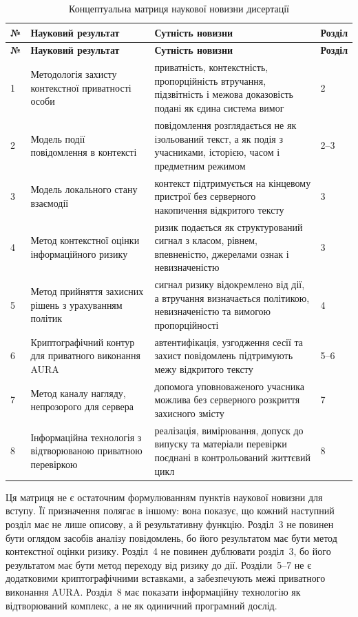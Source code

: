 \begin{longtable}{p{1.1cm} p{5.3cm} p{4.6cm} p{1.8cm}}
\caption{Концептуальна матриця наукової новизни дисертації}
\label{tab:concept-novelty}\\
\toprule
\textbf{№} & \textbf{Науковий результат} & \textbf{Сутність новизни} & \textbf{Розділ} \\
\midrule
\endfirsthead
\toprule
\textbf{№} & \textbf{Науковий результат} & \textbf{Сутність новизни} & \textbf{Розділ} \\
\midrule
\endhead
1 & Методологія захисту контекстної приватності особи & приватність, контекстність, пропорційність втручання, підзвітність і межова доказовість подані як єдина система вимог & 2 \\
2 & Модель події повідомлення в контексті & повідомлення розглядається не як ізольований текст, а як подія з учасниками, історією, часом і предметним режимом & 2--3 \\
3 & Модель локального стану взаємодії & контекст підтримується на кінцевому пристрої без серверного накопичення відкритого тексту & 3 \\
4 & Метод контекстної оцінки інформаційного ризику & ризик подається як структурований сигнал з класом, рівнем, впевненістю, джерелами ознак і невизначеністю & 3 \\
5 & Метод прийняття захисних рішень з урахуванням політик & сигнал ризику відокремлено від дії, а втручання визначається політикою, невизначеністю та вимогою пропорційності & 4 \\
6 & Криптографічний контур для приватного виконання AURA & автентифікація, узгодження сесії та захист повідомлень підтримують межу відкритого тексту & 5--6 \\
7 & Метод каналу нагляду, непрозорого для сервера & допомога уповноваженого учасника можлива без серверного розкриття захисного змісту & 7 \\
8 & Інформаційна технологія з відтворюваною приватною перевіркою & реалізація, вимірювання, допуск до випуску та матеріали перевірки поєднані в контрольований життєвий цикл & 8 \\
\bottomrule
\end{longtable}

Ця матриця не є остаточним формулюванням пунктів наукової новизни для вступу. Її призначення полягає в іншому: вона показує, що кожний наступний розділ має не лише описову, а й результативну функцію. Розділ~3 не повинен бути оглядом засобів аналізу повідомлень, бо його результатом має бути метод контекстної оцінки ризику. Розділ~4 не повинен дублювати розділ~3, бо його результатом має бути метод переходу від ризику до дії. Розділи~5--7 не є додатковими криптографічними вставками, а забезпечують межі приватного виконання AURA. Розділ~8 має показати інформаційну технологію як відтворюваний комплекс, а не як одиничний програмний дослід.

